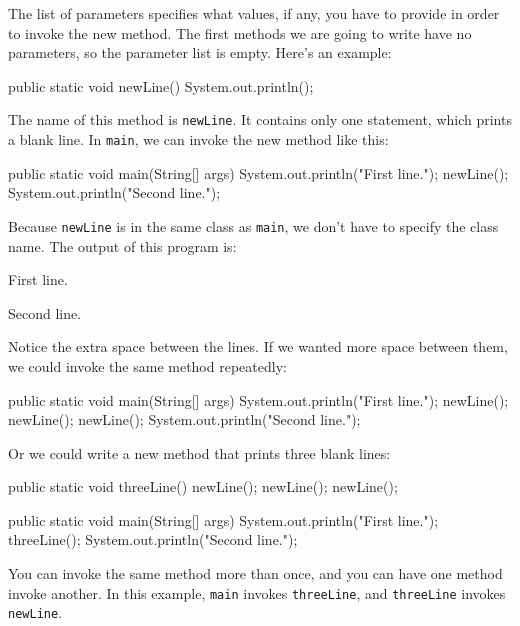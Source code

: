 \documentclass[12pt]{book}
\theoremstyle{exercise}
\newcommand{\java}[1]{\verb"#1"}
\newcommand{\java}[1]{\lstinline{#1}} %
\begin{document}

The list of parameters specifies what values, if any, you have to provide in order to invoke the new method.
The first methods we are going to write have no parameters, so the parameter list is empty.
Here's an example:

\begin{code}
    public static void newLine() {
        System.out.println();
    }
\end{code}

The name of this method is \java{newLine}.
It contains only one statement, which prints a blank line.
In \java{main}, we can invoke the new method like this:

\begin{code}
    public static void main(String[] args) {
        System.out.println("First line.");
        newLine();
        System.out.println("Second line.");
    }
\end{code}

Because \java{newLine} is in the same class as \java{main}, we don't have to specify the class name.
The output of this program is:

\begin{stdout}
First line.

Second line.
\end{stdout}

Notice the extra space between the lines.
If we wanted more space between them, we could invoke the same method repeatedly:

\begin{code}
    public static void main(String[] args) {
        System.out.println("First line.");
        newLine();
        newLine();
        newLine();
        System.out.println("Second line.");
    }
\end{code}

Or we could write a new method that prints three blank lines:

\begin{code}
    public static void threeLine() {
        newLine();
        newLine();
        newLine();
    }

    public static void main(String[] args) {
        System.out.println("First line.");
        threeLine();
        System.out.println("Second line.");
    }
\end{code}

You can invoke the same method more than once, and you can have one method invoke another.
In this example, \java{main} invokes \java{threeLine}, and \java{threeLine} invokes \java{newLine}.
\end{document}
